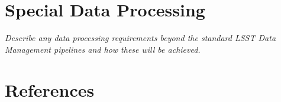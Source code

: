 \documentclass[11pt]{article}
\begin{document}
\vspace{.6in}

\section{Special Data Processing}
\begin{footnotesize}
{\it Describe any data processing requirements beyond the standard LSST Data Management pipelines and how these will be achieved.}
\end{footnotesize}


\section{References}
\end{document}
